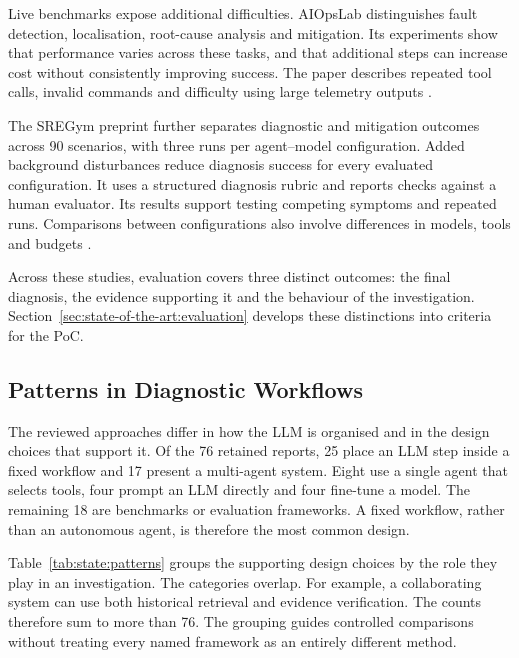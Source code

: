 Live benchmarks expose additional difficulties. AIOpsLab distinguishes
fault detection, localisation, root-cause analysis and mitigation. Its
experiments show that performance varies across these tasks, and that
additional steps can increase cost without consistently improving success.
The paper describes repeated tool calls, invalid commands and difficulty
using large telemetry outputs
\parencite[Sections~3.2--3.6]{chen2025aiopslab}.

The SREGym preprint further separates diagnostic and mitigation outcomes
across 90 scenarios, with three runs per agent--model configuration. Added
background disturbances reduce diagnosis success for every evaluated
configuration. It uses a structured diagnosis rubric and reports checks
against a human evaluator. Its results support testing competing symptoms
and repeated runs. Comparisons between configurations also involve
differences in models, tools and budgets
\parencite[Sections~2.5--3]{clark2026sregym}.

Across these studies, evaluation covers three distinct outcomes: the final
diagnosis, the evidence supporting it and the behaviour of the investigation.
Section~\ref{sec:state-of-the-art:evaluation} develops these distinctions
into criteria for the PoC.

\subsection{Patterns in Diagnostic Workflows}

The reviewed approaches differ in how the LLM is organised and in the
design choices that support it. Of the 76 retained reports, 25 place an LLM
step inside a fixed workflow and 17 present a multi-agent system. Eight
use a single agent that selects tools, four prompt an LLM directly and four
fine-tune a model. The remaining 18 are benchmarks or evaluation
frameworks. A fixed workflow, rather than an autonomous agent, is
therefore the most common design.

Table~\ref{tab:state:patterns} groups the supporting design choices by the
role they play in an investigation. The categories overlap. For example,
a collaborating system can use both historical retrieval and evidence
verification. The counts therefore sum to more than 76. The grouping
guides controlled comparisons without treating every named framework as
an entirely different method.

